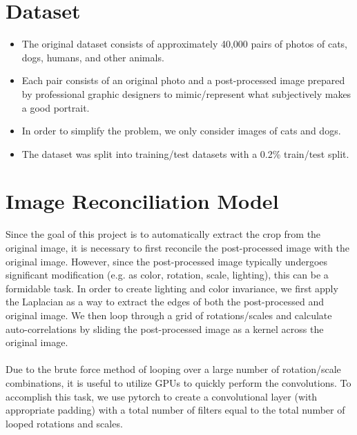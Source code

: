 \documentclass[portrait]{sciposter}
\begin{document}
\begin{multicols}{2}



\section*{Dataset}

\begin{itemize}
    \item The original dataset consists of approximately 40,000 pairs of photos of cats, dogs, humans, and other animals. 
    \item Each pair consists of an original photo and a post-processed image prepared by professional graphic designers to mimic/represent what subjectively makes a good portrait.
    \item In order to simplify the problem, we only consider images of cats and dogs.
    \item The dataset was split into training/test datasets with a 0.2\% train/test split.
\end{itemize}

 
\section*{Image Reconciliation Model}
Since the goal of this project is to automatically extract the crop  from the original image, it is necessary to first reconcile the post-processed image with the original image. However, since the post-processed image typically undergoes significant modification (e.g. as color, rotation, scale, lighting), this can be a formidable task. In order to create lighting and color invariance, we first apply the Laplacian as a way to extract the edges of both the post-processed and original image. We then loop through a grid of rotations/scales and calculate auto-correlations by sliding the post-processed image as a kernel across the original image.
\\
\\
Due to the brute force method of looping over a large number of rotation/scale combinations, it is useful to utilize GPUs to quickly perform the convolutions. To accomplish this task, we use pytorch  to create a convolutional layer  (with appropriate padding) with a total number of filters equal to the total number of looped rotations and scales.




\end{multicols}
\end{document}
